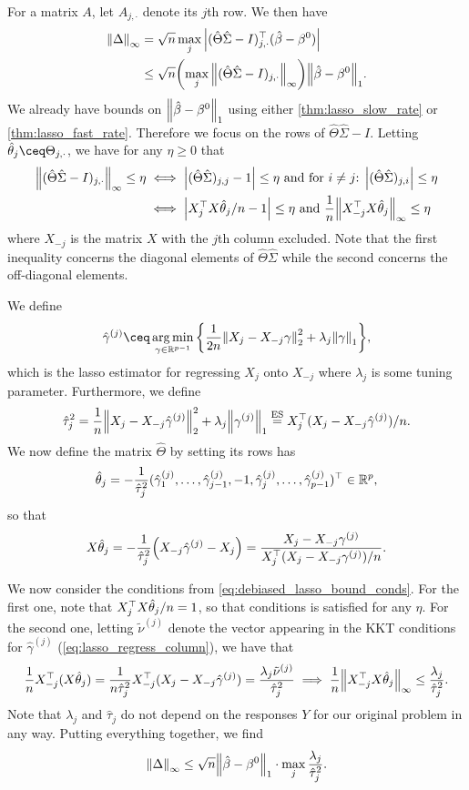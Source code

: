 For a matrix $A$, let $A_{j, \cdot}$ denote its $j$th row. We then have
\begin{align*}
	\norm{\Delta}_\infty &= \sqrt n\max_j \abs{(\hat\Theta\hat\Sigma - I)_{j, \cdot}^\top (\hat\beta - \beta^0)} \\
	&\leq  \sqrt n \qty(\max_j \norm{(\hat \Theta\hat\Sigma - I)_{j, \cdot}}_\infty)\norm{\hat\beta - \beta^0}_1. 
\end{align*}
We already have bounds on $\norm{\hat\beta - \beta^0}_1$ using either \cref{thm:lasso_slow_rate} or \cref{thm:lasso_fast_rate}. Therefore we focus on the rows of $\hat\Theta\hat\Sigma - I$. Letting $\hat\theta_j \ceq \Theta_{j, \cdot}$, we have for any $\eta \geq 0$ that 
\begin{align}
	\norm{(\hat\Theta\hat\Sigma - I)_{j, \cdot}}_\infty \leq \eta &\iff 
		\abs{(\hat\Theta\hat\Sigma)_{j, j} - 1} \leq \eta \text{ and for $i \neq j$: } \abs{(\hat\Theta\hat\Sigma)_{j, i}} \leq \eta \nonumber \\
		&\iff \abs{X_j^\top X \hat\theta_j / n - 1} \leq \eta  \text{ and } \frac1n\norm{X_{-j}^\top X \hat\theta_j}_\infty \leq \eta \label{eq:debiased_lasso_bound_conds}
\end{align}
where $X_{-j}$ is the matrix $X$ with the $j$th column excluded. Note that the first inequality concerns the diagonal elements of $\hat\Theta\hat\Sigma$ while the second concerns the off-diagonal elements. 

We define
\begin{equation} \label{eq:lasso_regress_column}
\hat\gamma^{(j)} \ceq \argmin_{\gamma \in \RR^{p-1}} \qty{\frac1{2n} \norm{X_j - X_{-j}\gamma}_2^2 + \lambda_j \norm{\gamma}_1}, 
\end{equation}
which is the lasso estimator for regressing $X_j$ onto $X_{-j}$ where $\lambda_j$ is some tuning parameter. Furthermore, we define 
\[
\hat\tau_j^2 = \frac1n \norm{X_j - X_{-j}\hat\gamma^{(j)}}_2^2 + \lambda_j \norm{\gamma^{(j)}}_1 \overset{\mathrm{ES}}=  X_j^\top (X_j - X_{-j}\hat\gamma^{(j)})/n. 
\]
We now define the matrix $\hat\Theta$ by setting its rows has
\[
\hat\theta_j = - \frac{1}{\hat \tau_j^2} (\hat \gamma_1^{(j)}, \dotsc, \hat\gamma_{j-1}^{(j)}, -1, \hat\gamma_j^{(j)}, \dotsc, \hat\gamma_{p-1}^{(j)})^\top  \in \mathbb R^p, 
\]
so that
\[
X\hat\theta_j = -\frac{1}{\hat\tau_j^2} \qty(X_{-j}\hat\gamma^{(j)}  - X_j) = \frac{X_j - X_{-j}\gamma^{(j)}}{X_j^\top (X_j - X_{-j}\gamma^{(j)}) / n}. 
\]

We now consider the conditions from \cref{eq:debiased_lasso_bound_conds}.  For the first one, note that $X_j^\top X \hat\theta_j / n = 1$, so that conditions is satisfied for any $\eta$. For the second one, letting $\tilde\nu^{(j)}$ denote the vector appearing in the KKT conditions for $\hat\gamma^{(j)}$ (\cref{eq:lasso_regress_column}), we have that
\[
\frac1n X_{-j}^\top(X \hat\theta_j) = \frac1{n\hat\tau_j^2} X_{-j}^\top (X_j - X_{-j}\hat\gamma^{(j)}) = \frac{\lambda_j \tilde \nu^{(j)}}{\hat\tau_j^2} \implies \frac1n \norm{X_{-j}^\top X \hat\theta_j}_\infty \leq \frac{\lambda_j}{\hat\tau_j^2}. 
\]
Note that $\lambda_j$ and $\hat\tau_j$ do not depend on the responses $Y$ for our original problem in any way.  Putting everything together, we find
\[
\norm{\Delta}_\infty\leq \sqrt n \norm{\hat\beta - \beta^0}_1 \cdot \max_j \frac{\lambda_j}{\hat\tau_j^2}.
\]

